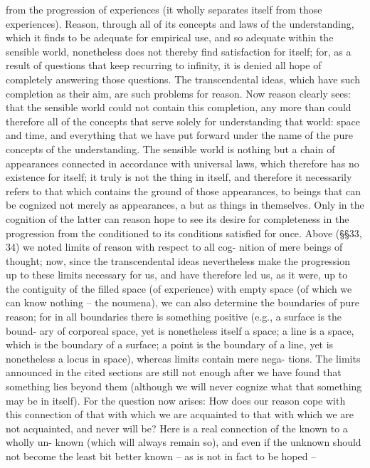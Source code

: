 from the progression of experiences (it wholly separates itself from those
experiences).
Reason, through all of its concepts and laws of the understanding,
which it ﬁnds to be adequate for empirical use, and so adequate within the
sensible world, nonetheless does not thereby ﬁnd satisfaction for itself;
for, as a result of questions that keep recurring to inﬁnity, it is denied
all hope of completely answering those questions. The transcendental
ideas, which have such completion as their aim, are such problems for
reason. Now reason clearly sees: that the sensible world could not contain
this completion, any more than could therefore all of the concepts that
serve solely for understanding that world: space and time, and everything
that we have put forward under the name of the pure concepts of the
understanding. The sensible world is nothing but a chain of appearances
connected in accordance with universal laws, which therefore has no
existence for itself; it truly is not the thing in itself, and therefore it
necessarily refers to that which contains the ground of those appearances,
to beings that can be cognized not merely as appearances, a but as things
in themselves. Only in the cognition of the latter can reason hope to see
its desire for completeness in the progression from the conditioned to
its conditions satisﬁed for once.
Above (§§33, 34) we noted limits of reason with respect to all cog-
nition of mere beings of thought; now, since the transcendental ideas
nevertheless make the progression up to these limits necessary for us,
and have therefore led us, as it were, up to the contiguity of the filled
space (of experience) with empty space (of which we can know nothing –
the noumena), we can also determine the boundaries of pure reason; for
in all boundaries there is something positive (e.g., a surface is the bound-
ary of corporeal space, yet is nonetheless itself a space; a line is a space,
which is the boundary of a surface; a point is the boundary of a line,
yet is nonetheless a locus in space), whereas limits contain mere nega-
tions. The limits announced in the cited sections are still not enough
after we have found that something lies beyond them (although we will
never cognize what that something may be in itself). For the question
now arises: How does our reason cope with this connection of that with
which we are acquainted to that with which we are not acquainted, and
never will be? Here is a real connection of the known to a wholly un-
known (which will always remain so), and even if the unknown should
not become the least bit better known – as is not in fact to be hoped –
